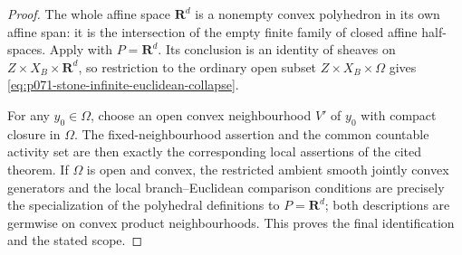\begin{proof}
The whole affine space $\mathbf R^d$ is a nonempty convex polyhedron in its
own affine span: it is the intersection of the empty finite family of closed
affine half-spaces.  Apply
 with
$P=\mathbf R^d$.  Its conclusion is an identity of sheaves on
$Z\times X_B\times\mathbf R^d$, so restriction to the ordinary open subset
$Z\times X_B\times\Omega$ gives
\eqref{eq:p071-stone-infinite-euclidean-collapse}.

For any $y_0\in\Omega$, choose an open convex neighbourhood $V'$ of $y_0$
with compact closure in $\Omega$.  The fixed-neighbourhood assertion and
the common countable activity set are then exactly the corresponding local
assertions of the cited theorem.  If $\Omega$ is open and convex, the
restricted ambient smooth jointly convex generators and the local
branch--Euclidean comparison conditions are precisely the specialization of
the polyhedral definitions to $P=\mathbf R^d$; both descriptions are
germwise on convex product neighbourhoods.  This proves the final
identification and the stated scope.
\end{proof}
